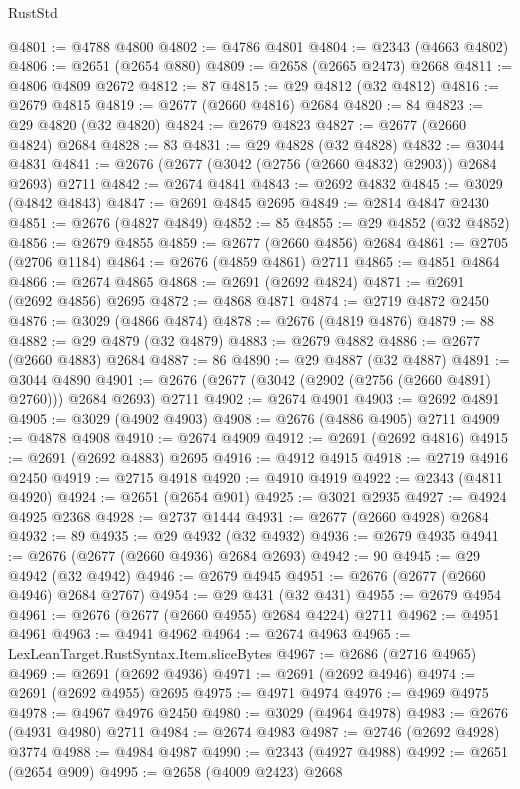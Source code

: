 \begin{lexlean}{RustStd}
\begin{coremodule}
{\begin{coremodule}
{{{{{{{{{{{{{{{{{{{{{{{{{{{{{{{{{{{{{{{{{{{{{{{{{{{{{{{@4801 := @4788 @4800
@4802 := @4786 @4801
@4804 := @2343 (@4663 @4802)
@4806 := @2651 (@2654 @880)
@4809 := @2658 (@2665 @2473) @2668
@4811 := @4806 @4809 @2672
@4812 := 87
@4815 := @29 @4812 (@32 @4812)
@4816 := @2679 @4815
@4819 := @2677 (@2660 @4816) @2684
@4820 := 84
@4823 := @29 @4820 (@32 @4820)
@4824 := @2679 @4823
@4827 := @2677 (@2660 @4824) @2684
@4828 := 83
@4831 := @29 @4828 (@32 @4828)
@4832 := @3044 @4831
@4841 := @2676 (@2677 (@3042 (@2756 (@2660 @4832) @2903)) @2684 @2693) @2711
@4842 := @2674 @4841
@4843 := @2692 @4832
@4845 := @3029 (@4842 @4843)
@4847 := @2691 @4845 @2695
@4849 := @2814 @4847 @2430
@4851 := @2676 (@4827 @4849)
@4852 := 85
@4855 := @29 @4852 (@32 @4852)
@4856 := @2679 @4855
@4859 := @2677 (@2660 @4856) @2684
@4861 := @2705 (@2706 @1184)
@4864 := @2676 (@4859 @4861) @2711
@4865 := @4851 @4864
@4866 := @2674 @4865
@4868 := @2691 (@2692 @4824)
@4871 := @2691 (@2692 @4856) @2695
@4872 := @4868 @4871
@4874 := @2719 @4872 @2450
@4876 := @3029 (@4866 @4874)
@4878 := @2676 (@4819 @4876)
@4879 := 88
@4882 := @29 @4879 (@32 @4879)
@4883 := @2679 @4882
@4886 := @2677 (@2660 @4883) @2684
@4887 := 86
@4890 := @29 @4887 (@32 @4887)
@4891 := @3044 @4890
@4901 := @2676 (@2677 (@3042 (@2902 (@2756 (@2660 @4891) @2760))) @2684 @2693) @2711
@4902 := @2674 @4901
@4903 := @2692 @4891
@4905 := @3029 (@4902 @4903)
@4908 := @2676 (@4886 @4905) @2711
@4909 := @4878 @4908
@4910 := @2674 @4909
@4912 := @2691 (@2692 @4816)
@4915 := @2691 (@2692 @4883) @2695
@4916 := @4912 @4915
@4918 := @2719 @4916 @2450
@4919 := @2715 @4918
@4920 := @4910 @4919
@4922 := @2343 (@4811 @4920)
@4924 := @2651 (@2654 @901)
@4925 := @3021 @2935
@4927 := @4924 @4925 @2368
@4928 := @2737 @1444
@4931 := @2677 (@2660 @4928) @2684
@4932 := 89
@4935 := @29 @4932 (@32 @4932)
@4936 := @2679 @4935
@4941 := @2676 (@2677 (@2660 @4936) @2684 @2693)
@4942 := 90
@4945 := @29 @4942 (@32 @4942)
@4946 := @2679 @4945
@4951 := @2676 (@2677 (@2660 @4946) @2684 @2767)
@4954 := @29 @431 (@32 @431)
@4955 := @2679 @4954
@4961 := @2676 (@2677 (@2660 @4955) @2684 @4224) @2711
@4962 := @4951 @4961
@4963 := @4941 @4962
@4964 := @2674 @4963
@4965 := LexLeanTarget.RustSyntax.Item.sliceBytes
@4967 := @2686 (@2716 @4965)
@4969 := @2691 (@2692 @4936)
@4971 := @2691 (@2692 @4946)
@4974 := @2691 (@2692 @4955) @2695
@4975 := @4971 @4974
@4976 := @4969 @4975
@4978 := @4967 @4976 @2450
@4980 := @3029 (@4964 @4978)
@4983 := @2676 (@4931 @4980) @2711
@4984 := @2674 @4983
@4987 := @2746 (@2692 @4928) @3774
@4988 := @4984 @4987
@4990 := @2343 (@4927 @4988)
@4992 := @2651 (@2654 @909)
@4995 := @2658 (@4009 @2423) @2668
}}}}}}}}}}}}}}}}}}}}}}}}}}}}}}}}}}}}}}}}}}}}}}}}}}}}}}}
\end{coremodule}}
\end{coremodule}
\end{lexlean}
